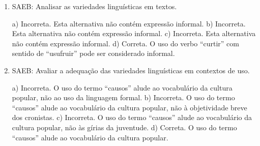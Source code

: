 \begin{enumerate}
	\item
SAEB: Analisar as variedades linguísticas em textos.

a) Incorreta. Esta alternativa não contém expressão informal.
b) Incorreta. Esta alternativa não contém expressão informal.
c) Incorreta. Esta alternativa não contém expressão informal.
d) Correta. O uso do verbo ``curtir'' com sentido de ``usufruir'' pode ser considerado informal. 
	
	\item
SAEB: Avaliar a adequação das variedades linguísticas em contextos de uso.

a) Incorreta. O uso do termo ``causos'' alude ao vocabulário da cultura popular, 
não ao uso da linguagem formal.
b) Incorreta. O uso do termo ``causos'' alude ao vocabulário da cultura popular, 
não à objetividade breve dos cronistas.
c) Incorreta. O uso do termo ``causos'' alude ao vocabulário da cultura popular, 
não às gírias da juventude.
d) Correta. O uso do termo ``causos'' alude ao vocabulário da cultura popular.
\end{enumerate}


